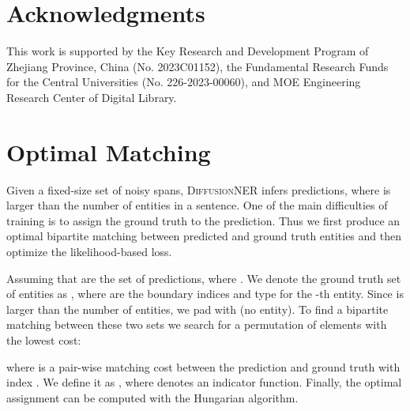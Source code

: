 \documentclass[11pt]{article}
\begin{document}
\section*{Acknowledgments}
This work is supported by the Key Research and Development Program of Zhejiang Province, China (No. 2023C01152),  the Fundamental Research Funds for the Central Universities (No. 226-2023-00060), and MOE Engineering Research Center of Digital Library.




\clearpage
\appendix


\section{Optimal Matching }
\label{app:pi}

Given a fixed-size set of  noisy spans, \textsc{DiffusionNER} infers  predictions, where  is larger than the number of 
entities in a sentence. One of the main difficulties of training is to assign the ground truth to the prediction. Thus we first produce an optimal bipartite matching between predicted and ground truth entities and then optimize the likelihood-based loss.

Assuming that  are the set of  predictions, where . We denote the ground truth set of  entities as , where  are the boundary indices and type for the -th entity. Since  is larger than the number of  entities, we pad  with  (no entity). To find
a bipartite matching between these two sets we search for a permutation of  elements  with the lowest cost:

\noindent where  is a pair-wise matching cost between the prediction  and ground truth  with index . We define it as
,
\noindent where  denotes an indicator function. Finally, the optimal assignment  can be computed with the Hungarian algorithm.
\end{document}
